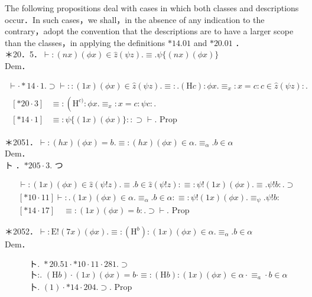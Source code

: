 \documentclass[10pt]{article}
\begin{document}
The following propositions deal with cases in which both classes and descriptions occur．In such cases，we shall，in the absence of any indication to the contrary，adopt the convention that the descriptions are to have a larger scope than the classes，in applying the definitions $* 14.01$ and $* 20.01$ ．\\
＊20．5．$\vdash:(n x)(\phi x) \in \hat{z}(\psi z) . \equiv . \psi\{(n x)(\phi x)\}$\\
Dem．

$$
\begin{array}{ll}
\vdash \cdot * 14 \cdot 1 . \supset \vdash::(1 x)(\phi x) \in \hat{z}(\psi z) . \equiv: .(\mathrm{H} c): \phi x . \equiv_{x}: x=c: c \in \hat{z}(\psi z): . \\
\begin{array}{ll}
{[* 20 \cdot 3]} & \equiv:\left(\mathrm{H}^{c)}: \phi x . \equiv_{x}: x=c: \psi c: .\right. \\
{[* 14 \cdot 1]} & \equiv: \psi\{(1 x)(\phi x)\}:: \supset \vdash . \text { Prop }
\end{array}
\end{array}
$$

＊2051．$\vdash:(h x)(\phi x)=b . \equiv:(h x)(\phi x) \in \alpha . \equiv_{\alpha} . b \in \alpha$\\
Dem．\\
ト ．$* 205 \cdot 3$. つ

$$
\begin{aligned}
& \vdash:(1 x)(\phi x) \in \hat{z}(\psi!z) . \equiv . b \in \hat{z}(\psi!z): \equiv: \psi!(1 x)(\phi x) . \equiv . \psi!b: . \supset \\
& {[* 10 \cdot 11] \vdash: .(1 x)(\phi x) \in \alpha . \equiv_{\alpha} . b \in \alpha: \equiv: \psi!(1 x)(\phi x) . \equiv_{\psi} . \psi!b:} \\
& {[* 14 \cdot 17] \quad \equiv:(1 x)(\phi x)=b: . \supset \vdash . \text { Prop }}
\end{aligned}
$$

＊2052．$\vdash: \mathrm{E}!(7 x)(\phi x) . \equiv:\left(\mathrm{H}^{b}\right):(1 x)(\phi x) \in \alpha . \equiv_{\alpha} . b \in \alpha$\\
Dem．


\begin{align*}
& \text { ト. } * 20.51 \cdot * 10 \cdot 11 \cdot 281 . \supset \\
& \text { 卜:. }(\mathrm{H} b) \cdot(1 x)(\phi x)=b \cdot \equiv:(\mathrm{H} b):(1 x)(\phi x) \in \alpha \cdot \equiv_{a} \cdot b \in \alpha  \tag{1}\\
& \text { 卜. }(1) \cdot * 14 \cdot 204 . \supset \text {. Prop }
\end{align*}
\end{document}
